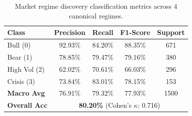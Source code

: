 \begin{table}[htbp]
\centering
\caption{Market regime discovery classification metrics across 4 canonical regimes.}
\label{tab:regime_confusion}
\begin{tabular}{lcccc}
\toprule
\textbf{Class} & \textbf{Precision} & \textbf{Recall} & \textbf{F1-Score} & \textbf{Support} \\
\midrule
Bull (0)        &  92.93\% &  84.20\% &  88.35\% &     671 \\
Bear (1)        &  78.85\% &  79.47\% &  79.16\% &     380 \\
High Vol (2)    &  62.02\% &  70.61\% &  66.03\% &     296 \\
Crisis (3)      &  73.84\% &  83.01\% &  78.15\% &     153 \\
\midrule
\textbf{Macro Avg}   &  76.91\% &  79.32\% &  77.93\% &    1500 \\
\textbf{Overall Acc} & \multicolumn{4}{c}{\textbf{80.20\%} (Cohen's $\kappa$: 0.716)} \\
\bottomrule
\end{tabular}
\end{table}